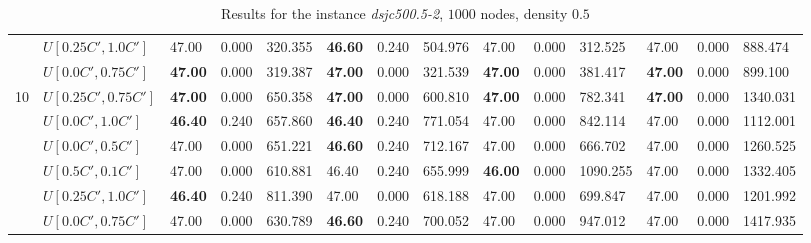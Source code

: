 \begin{table}[h]
{\begin{tabular}{|l|l||l|l|l||l|l|l||l|l|l||l|l|l|}
       & $U[0.25C',1.0C']$ & 47.00 & 0.000 & 320.355 & \textbf{46.60} & 0.240 & 504.976 				& 47.00 & 0.000 & 312.525 & 47.00 & 0.000 & 888.474\\
       & $U[0.0C',0.75C']$ & \textbf{47.00} & 0.000 & 319.387 & \textbf{47.00} & 0.000 & 321.539 	& \textbf{47.00} & 0.000 & 381.417 & \textbf{47.00} & 0.000 & 899.100\\
      \hline\hline
      \multirow{6}{*}{10}
       & $U[0.25C',0.75C']$ & \textbf{47.00} & 0.000 & 650.358 & \textbf{47.00} & 0.000 & 600.810 	& \textbf{47.00} & 0.000 & 782.341 & \textbf{47.00} & 0.000 & 1340.031\\
       & $U[0.0C',1.0C']$ & \textbf{46.40} & 0.240 & 657.860 & \textbf{46.40} & 0.240 & 771.054		& 47.00 & 0.000 & 842.114 & 47.00 & 0.000 & 1112.001\\
       & $U[0.0C',0.5C']$ & 47.00 & 0.000 & 651.221 & \textbf{46.60} & 0.240 & 712.167 				& 47.00 & 0.000 & 666.702 & 47.00 & 0.000 & 1260.525\\
       & $U[0.5C',0.1C']$ & 47.00 & 0.000 & 610.881 & 46.40 & 0.240 & 655.999 						& \textbf{46.00} & 0.000 & 1090.255 & 47.00 & 0.000 & 1332.405\\
       & $U[0.25C',1.0C']$ & \textbf{46.40} & 0.240 & 811.390 & 47.00 & 0.000 & 618.188 				& 47.00 & 0.000 & 699.847 & 47.00 & 0.000 & 1201.992\\
       & $U[0.0C',0.75C']$ & 47.00 & 0.000 & 630.789 & \textbf{46.60} & 0.240 & 700.052 				& 47.00 & 0.000 & 947.012 & 47.00 & 0.000 & 1417.935\\
      \hline
      \end{tabular}
      }
      \caption{Results for the instance \textit{dsjc500.5-2}, $1000$ nodes, density $0.5$}
      \label{tab:in2}
      \end{table}


